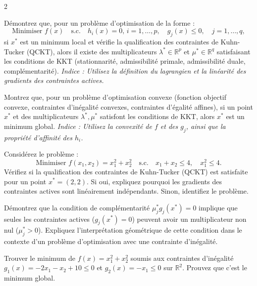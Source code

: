 \begin{multicols}{2}

\begin{exo}
	Démontrez que, pour un problème d'optimisation de la forme :
	\[
	\text{Minimiser } f(x) \quad \text{s.c.} \quad h_i(x) = 0, \, i=1,\dots,p, \quad g_j(x) \leq 0, \quad j=1,\dots,q,
	\]
	si \( x^* \) est un minimum local et vérifie la qualification des contraintes de Kuhn-Tucker (QCKT), alors il existe des multiplicateurs \( \lambda^* \in \mathbb{R}^p \) et \( \mu^* \in \mathbb{R}^q \) satisfaisant les conditions de KKT (stationnarité, admissibilité primale, admissibilité duale, complémentarité). \textit{Indice : Utilisez la définition du lagrangien et la linéarité des gradients des contraintes actives.}
\end{exo}

\begin{exo}
	Montrez que, pour un problème d'optimisation convexe (fonction objectif convexe, contraintes d'inégalité convexes, contraintes d'égalité affines), si un point \( x^* \) et des multiplicateurs \( \lambda^*, \mu^* \) satisfont les conditions de KKT, alors \( x^* \) est un minimum global. \textit{Indice : Utilisez la convexité de \( f \) et des \( g_j \), ainsi que la propriété d'affinité des \( h_i \).}
\end{exo}

\begin{exo}
	Considérez le problème :
	\[
	\text{Minimiser } f(x_1, x_2) = x_1^2 + x_2^2 \quad \text{s.c.} \quad x_1 + x_2 \leq 4, \quad x_1^2 \leq 4.
	\]
	Vérifiez si la qualification des contraintes de Kuhn-Tucker (QCKT) est satisfaite pour un point \( x^* = (2, 2) \). Si oui, expliquez pourquoi les gradients des contraintes actives sont linéairement indépendants. Sinon, identifiez le problème.
\end{exo}

\begin{exo}
	Démontrez que la condition de complémentarité \( \mu_j^* g_j(x^*) = 0 \) implique que seules les contraintes actives (\( g_j(x^*) = 0 \)) peuvent avoir un multiplicateur non nul (\( \mu_j^* > 0 \)). Expliquez l'interprétation géométrique de cette condition dans le contexte d'un problème d'optimisation avec une contrainte d'inégalité.
\end{exo}

\begin{exo}
	Trouver le minimum de $f(x) = x_{1}^{2} + x_{2}^{2}$ soumis aux contraintes d'inégalité $g_{1}(x) = -2x_{1} - x_{2} + 10 \leqslant 0$ et $g_{2}(x) = -x_{1} \leqslant 0$ sur $\mathbb{R}^{2}$. Prouvez que c'est le minimum global.
\end{exo}


\end{multicols}
